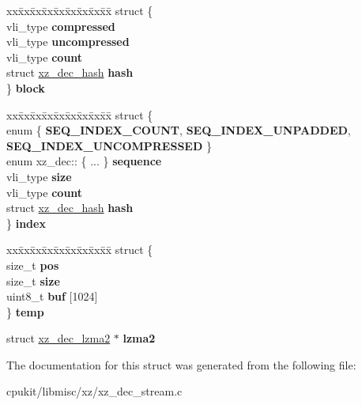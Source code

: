 \begin{DoxyCompactItemize}
\begin{tabbing}
\end{tabbing}\item 
\mbox{\label{structxz__dec_a184bd1f67d252702661b04b13d1048ad}} 
\begin{tabbing}
xx\=xx\=xx\=xx\=xx\=xx\=xx\=xx\=xx\=\kill
struct \{\\
\>vli\_type {\bfseries compressed}\\
\>vli\_type {\bfseries uncompressed}\\
\>vli\_type {\bfseries count}\\
\>struct \mbox{\hyperlink{structxz__dec__hash}{xz\_dec\_hash}} {\bfseries hash}\\
\} {\bfseries block}\\

\end{tabbing}\item 
\mbox{\label{structxz__dec_a0e4400e39f5a8742fc0bae0b295fd699}} 
\begin{tabbing}
xx\=xx\=xx\=xx\=xx\=xx\=xx\=xx\=xx\=\kill
struct \{\\
\mbox{\label{structxz__dec_1_1_0D4033_a2b9a08ced685854b26e87f078f5e905c}} 
enum \{ {\bfseries SEQ\_INDEX\_COUNT}, 
{\bfseries SEQ\_INDEX\_UNPADDED}, 
{\bfseries SEQ\_INDEX\_UNCOMPRESSED}
 \}\\
\>enum xz\_dec:: \{ ... \}  {\bfseries sequence}\\
\>vli\_type {\bfseries size}\\
\>vli\_type {\bfseries count}\\
\>struct \mbox{\hyperlink{structxz__dec__hash}{xz\_dec\_hash}} {\bfseries hash}\\
\} {\bfseries index}\\

\end{tabbing}\item 
\mbox{\label{structxz__dec_a929aa0bfe5f8e35564d7bf0cae34ed99}} 
\begin{tabbing}
xx\=xx\=xx\=xx\=xx\=xx\=xx\=xx\=xx\=\kill
struct \{\\
\>size\_t {\bfseries pos}\\
\>size\_t {\bfseries size}\\
\>uint8\_t {\bfseries buf} \mbox{[}1024\mbox{]}\\
\} {\bfseries temp}\\

\end{tabbing}\item 
\mbox{\label{structxz__dec_a4cfe68d9a51cc36d2c688979b439898b}} 
struct \mbox{\hyperlink{structxz__dec__lzma2}{xz\+\_\+dec\+\_\+lzma2}} $\ast$ {\bfseries lzma2}
\end{DoxyCompactItemize}


The documentation for this struct was generated from the following file\+:\begin{DoxyCompactItemize}
\item 
cpukit/libmisc/xz/xz\+\_\+dec\+\_\+stream.\+c\end{DoxyCompactItemize}
